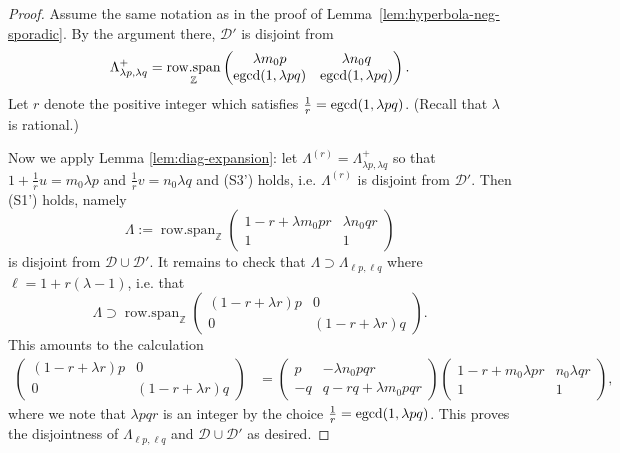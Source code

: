 \documentclass[11pt, letterpaper, reqno]{amsart}
\theoremstyle{definition}
\theoremstyle{remark}
\numberwithin{equation}{section}
\newcommand{\ZZ}{\ensuremath{\mathbb{Z}}}
\newcommand{\cD}{\mathcal{D}}
\newcommand{\cDprime}{{\mathcal{D}'}}
\newcommand{\muu}{u}
\newcommand{\nuu}{v}
\newcommand{\egcd}{{\rm egcd}}
\DeclareMathOperator{\rowspan}{row.span}
\begin{document}
\begin{proof}
Assume the same notation as in the proof of Lemma~\ref{lem:hyperbola-neg-sporadic}.
By the argument there, $\cDprime$ is disjoint from 
\[ \Lambda^+_{\lambda p,\lambda q} = \rowspan_\ZZ \begin{pmatrix}
\lambda m_0 p & \lambda n_0 q  \\
\egcd(1,\lambda pq) & \egcd(1, \lambda pq) 
\end{pmatrix} .\]
Let $r$ denote the positive integer which satisfies $\frac{1}{r} = \egcd(1, \lambda pq)$.
(Recall that $\lambda$ is rational.)

Now we apply Lemma \ref{lem:diag-expansion}:
let $\Lambda^{(r)} = \Lambda^+_{\lambda p,\lambda q}$ 
so that $1 + \frac{1}{r}\muu = m_0\lambda p$ and $\frac{1}{r}\nuu = n_0\lambda q$
and 
(S3') holds,
i.e. $\Lambda^{(r)}$ is disjoint from $\cDprime$.
Then (S1') holds, namely
$$
 \Lambda := \rowspan_\ZZ\begin{pmatrix}
1 - r + \lambda m_0 pr & \lambda n_0  qr \\
1 & 1
\end{pmatrix} 
$$
is disjoint from $\cD \cup \cDprime$.
It remains to check that 
$\Lambda \supset \Lambda_{\ell p, \ell q}$
where $\ell = 1 + r(\lambda - 1)$, 
i.e. that
\[ \Lambda \supset \rowspan_\ZZ\begin{pmatrix}
(1 - r+ \lambda r)p & 0  \\
0 & (1 - r + \lambda r)q 
\end{pmatrix} .\]
This amounts to the calculation
\begin{align*}
\begin{pmatrix}
(1 - r+ \lambda r)p & 0  \\
0 & (1 - r + \lambda r)q 
\end{pmatrix}  
&= \begin{pmatrix}
p & - \lambda n_0 pqr \\
-q & q - rq + \lambda m_0 pqr
\end{pmatrix}
\begin{pmatrix}
1 - r + m_0\lambda pr  & n_0 \lambda qr \\
1 & 1
\end{pmatrix},
\end{align*}
where we note that $\lambda pqr $ is an integer by the choice 
$\frac{1}{r} = \egcd(1, \lambda pq)$.
This proves the disjointness of $\Lambda_{\ell p, \ell q}$ and $\cD\cup \cDprime$ as desired.
\end{proof}
\end{document}
